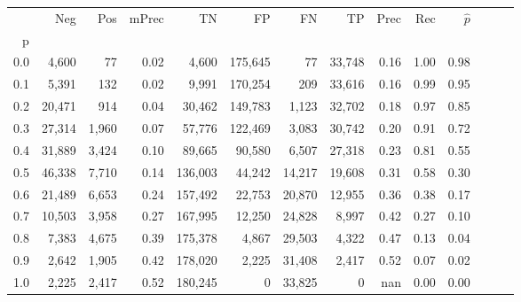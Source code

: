 \begin{tabular}{rrrrrrrrrrrrrr}
\toprule
{} &     Neg &    Pos & mPrec &       TN &       FP &      FN &      TP &  Prec &   Rec & $\hat{p}$ \\
p   &         &        &       &          &          &         &         &       &       &           \\
\midrule
0.0 &   4,600 &     77 &  0.02 &    4,600 &  175,645 &      77 &  33,748 &  0.16 &  1.00 &      0.98 \\
0.1 &   5,391 &    132 &  0.02 &    9,991 &  170,254 &     209 &  33,616 &  0.16 &  0.99 &      0.95 \\
0.2 &  20,471 &    914 &  0.04 &   30,462 &  149,783 &   1,123 &  32,702 &  0.18 &  0.97 &      0.85 \\
0.3 &  27,314 &  1,960 &  0.07 &   57,776 &  122,469 &   3,083 &  30,742 &  0.20 &  0.91 &      0.72 \\
0.4 &  31,889 &  3,424 &  0.10 &   89,665 &   90,580 &   6,507 &  27,318 &  0.23 &  0.81 &      0.55 \\
0.5 &  46,338 &  7,710 &  0.14 &  136,003 &   44,242 &  14,217 &  19,608 &  0.31 &  0.58 &      0.30 \\
0.6 &  21,489 &  6,653 &  0.24 &  157,492 &   22,753 &  20,870 &  12,955 &  0.36 &  0.38 &      0.17 \\
0.7 &  10,503 &  3,958 &  0.27 &  167,995 &   12,250 &  24,828 &   8,997 &  0.42 &  0.27 &      0.10 \\
0.8 &   7,383 &  4,675 &  0.39 &  175,378 &    4,867 &  29,503 &   4,322 &  0.47 &  0.13 &      0.04 \\
0.9 &   2,642 &  1,905 &  0.42 &  178,020 &    2,225 &  31,408 &   2,417 &  0.52 &  0.07 &      0.02 \\
1.0 &   2,225 &  2,417 &  0.52 &  180,245 &        0 &  33,825 &       0 &   nan &  0.00 &      0.00 \\
\bottomrule
\end{tabular}
